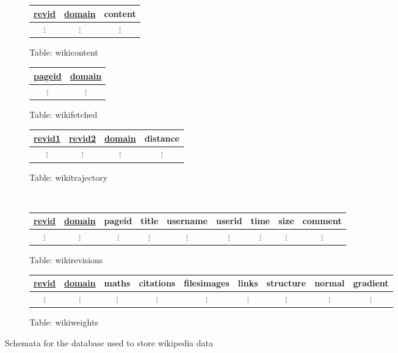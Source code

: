 \begin{figure}
  \centering
  \begin{subfigure}[t]{0.3\linewidth}
    \centering
    \begin{tabular}{ccc}
      \toprule
      \underline{revid} & \underline{domain} & content\\
      \midrule
      $\vdots$ & $\vdots$ & $\vdots$\\
    \end{tabular}
    \caption{Table: wikicontent}
  \end{subfigure}
  \begin{subfigure}[t]{0.2\linewidth}
    \centering
    \begin{tabular}{cc}
      \toprule
      \underline{pageid} & \underline{domain} \\
      \midrule
      $\vdots$ & $\vdots$\\
    \end{tabular}
    \caption{Table: wikifetched}
  \end{subfigure}
  \begin{subfigure}[t]{0.4\linewidth}
    \centering
    \begin{tabular}{cccc}
      \toprule
      \underline{revid1} & \underline{revid2} & \underline{domain} & distance\\
      \midrule
      $\vdots$ & $\vdots$ & $\vdots$ & $\vdots$ \\
    \end{tabular}
    \caption{Table: wikitrajectory}
  \end{subfigure}\\
  \vspace{10 mm}
  \begin{subfigure}[b!]{\linewidth}
    \centering
    \begin{tabular}{ccccccccc}
      \toprule
      \underline{revid} & \underline{domain} & pageid & title & username & userid & time & size &
      comment \\ 
      \midrule
      $\vdots$ & $\vdots$ & $\vdots$ & $\vdots$ & $\vdots$ & $\vdots$ & $\vdots$
      & $\vdots$ & $\vdots$ \\
    \end{tabular}
    \caption{Table: wikirevisions}
  \end{subfigure}
  \vspace{30 mm}
  \begin{subfigure}[b!]{\linewidth}
    \centering
    \begin{tabular}{ccccccccc}
      \toprule
      \underline{revid} & \underline{domain} & maths & citations & filesimages & links &
      structure & normal & gradient\\
      \midrule
      $\vdots$ & $\vdots$ & $\vdots$ & $\vdots$ & $\vdots$ & $\vdots$ &
      $\vdots$ & $\vdots$ & $\vdots$ \\
    \end{tabular}
    \caption{Table: wikiweights} 
  \end{subfigure}
  \caption{Schemata for the database used to store wikipedia data}
  \label{database-schema}
\end{figure}

